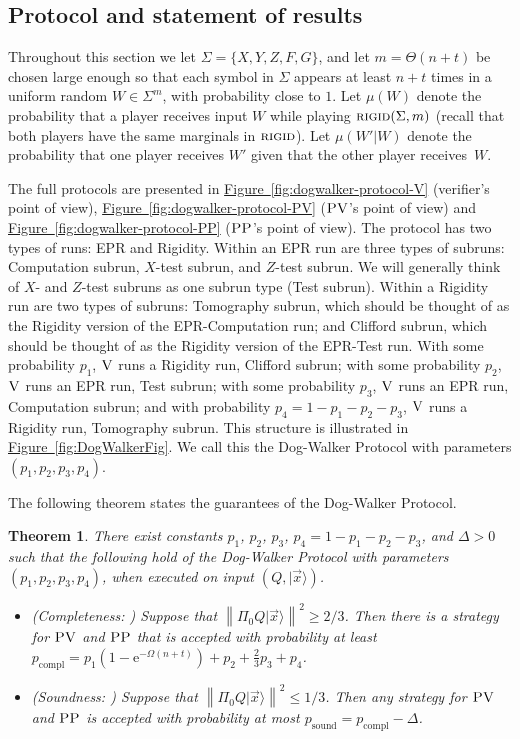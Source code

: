 \documentclass[11pt]{article}
\numberwithin{equation}{section}
\newtheorem{theorem}{Theorem}[section]
\theoremstyle{definition}
\theoremstyle{plain}
\newcommand{\eee}{\mathrm e}
\newcommand{\expref}[2]{\hyperref[#2]{#1~\ref{#2}}}
\newcommand{\ket}[1]{|#1\rangle}
\DeclareMathOperator{\sound}{sound}
\DeclareMathOperator{\compl}{compl}
\newcommand{\norm}[1]{\left\|#1\right\|}
\newcommand{\rigid}{\textsc{rigid}}
\newcommand{\ver}{\textsc{V}}
\newcommand{\pv}{\textsc{PV}}
\newcommand{\pp}{\textsc{PP}}
\begin{document}
\subsection{Protocol and statement of results}


Throughout this section we 
let $\Sigma=\{X,Y,Z,F,G\}$, and let $m=\Theta(n+t)$ be chosen 
large enough so that each symbol in $\Sigma$ appears at least $n+t$ times in a uniform random $W\in\Sigma^m$, with probability close to $1$.
Let $\mu({W})$ denote the probability that a player receives input ${W}$ while playing $\rigid(\Sigma,m)$ (recall that both players have the same marginals in $\rigid$). Let $\mu({W}'|{W})$ denote the probability that one player receives ${W}'$ given that the other player receives~${W}$. 

The full protocols are presented in \expref{Figure}{fig:dogwalker-protocol-V} (verifier's point of view), \expref{Figure}{fig:dogwalker-protocol-PV} ($\pv$'s point of view) and \expref{Figure}{fig:dogwalker-protocol-PP} ($\pp$'s point of view). The protocol has two 
types of runs: 
EPR and Rigidity. Within an EPR run are three 
types of subruns: 
Computation subrun, $X$-test subrun, and $Z$-test subrun. We will generally think of $X$- and $Z$-test subruns as one subrun type (Test subrun). Within a Rigidity run are two types of subruns: Tomography subrun, which should be thought of as the Rigidity version of the EPR-Computation run; and Clifford subrun, which should be thought of as the Rigidity version of the EPR-Test run. With some probability $p_1$, $\ver$ runs a Rigidity run, Clifford subrun; with some probability $p_2$, $\ver$ runs an EPR run, Test subrun; with some probability $p_3$, $\ver$ runs an EPR run, Computation subrun; and with probability $p_4=1-p_1-p_2-p_3$, $\ver$ runs a Rigidity run, Tomography subrun. This structure is illustrated in \expref{Figure}{fig:DogWalkerFig}. We call this the Dog-Walker Protocol with parameters $(p_1,p_2,p_3,p_4)$.



The following theorem states the guarantees of the Dog-Walker Protocol.


\begin{theorem}\label{thm:dog-walker}
There exist constants $p_1$, $p_2$, $p_3$, $p_4=1-p_1-p_2-p_3$, and $\Delta>0$ such that the following hold of the Dog-Walker Protocol with parameters $(p_1,p_2,p_3,p_4)$, when executed on input $(Q,\ket{\vec{x}})$.
\begin{itemize}
\item (Completeness: ) Suppose that $\norm{\Pi_0Q\ket{\vec{x}}}^2\geq 2/3$. Then
  there is a strategy for $\pv$ and $\pp$ that is accepted with probability at
    least $p_{\compl}=p_1(1-\eee^{-\Omega(n+t)})+p_2+\frac{2}{3}p_3 +
    p_4$. 
\item (Soundness: ) Suppose that $\norm{\Pi_0Q\ket{\vec{x}}}^2\leq 1/3$. Then any strategy for $\pv$ and $\pp$ is accepted with probability at most $p_{\sound}=p_{\compl}-\Delta$. 
\end{itemize}
\end{theorem}
\end{document}
